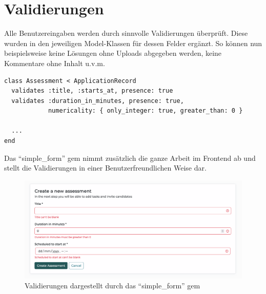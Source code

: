 \section{Validierungen}

Alle Benutzereingaben werden durch sinnvolle Validierungen überprüft. Diese wurden in den jeweiligen Model-Klassen
für dessen Felder ergänzt. So können nun beispielsweise keine Lösungen ohne Uploads abgegeben werden, keine Kommentare
ohne Inhalt u.v.m.

\begin{codebox}
\begin{verbatim}
class Assessment < ApplicationRecord
  validates :title, :starts_at, presence: true
  validates :duration_in_minutes, presence: true, 
            numericality: { only_integer: true, greater_than: 0 }

  ...
end
\end{verbatim}
\end{codebox}

Das \enquote{simple\_form} gem nimmt zusätzlich die ganze Arbeit im Frontend ab und stellt die Validierungen in einer Benutzerfreundlichen
Weise dar.

\begin{figure}[H]
  \centering
  \includegraphics[width=\textwidth]{images/ui/validations.png}
  \caption{\label{fig:validations} Validierungen dargestellt durch das \enquote{simple\_form} gem}
\end{figure}
